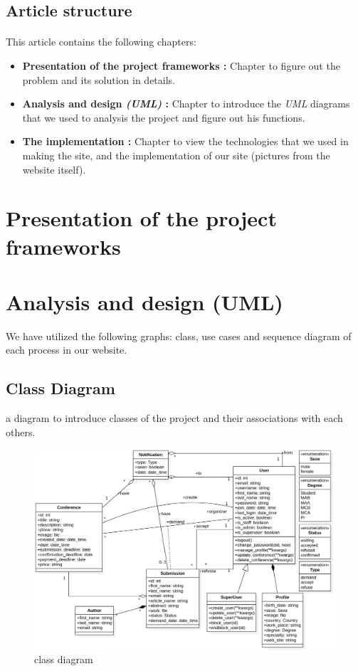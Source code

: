 \documentclass[12pt,a4paper]{article}
\begin{document}
	\subsection{Article structure}
	\paragraph{}
	This article contains the following chapters:
	\begin{itemize}
		
		\item \textbf{Presentation of the project frameworks :}
		Chapter to figure out the problem and its solution in details.
		
		\item \textbf{Analysis and design \textit{(UML)} :}
		Chapter to introduce the \textit{UML} diagrams that we used to analysis the project and figure out his functions.
		
		\item \textbf{The implementation :}
		Chapter to view  the technologies that we used in making the site, and the implementation of our site (pictures from the website itself).
		
	\end{itemize}
	\clearpage
	\section{Presentation of the project frameworks}
	
	\clearpage
	\section{Analysis and design (UML)}
	We have utilized the following graphs: class, use cases and sequence diagram of each process in our website.
	
	\subsection{Class Diagram}
	a diagram to introduce classes of the project and their associations with each others.
	
		\begin{figure}[!h]
			\centering
			\includegraphics[width=\textwidth]{diagrams/class.png}
			\caption{class diagram}
			\label{fig:class-d}
		\end{figure}
\end{document}
